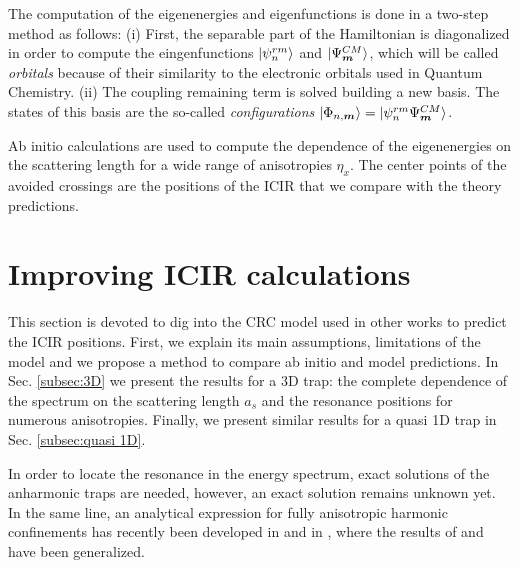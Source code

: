 \documentclass[aps,pre,twocolumn,superscriptaddress,showpacs]{revtex4-1}
\newcommand{\bfeq}[1]{{\boldsymbol{#1}}}
\begin{document}
The computation of the eigenenergies and eigenfunctions is done in a two-step method as follows: (i) First, the separable part of the Hamiltonian is diagonalized in order to compute the eingenfunctions $\ket{\psi^{rm}_n}$ and $\ket{\Psi^{CM}_{\bfeq{m}}}$, which will be called \textit{orbitals} because of their similarity to the electronic orbitals used in Quantum Chemistry. (ii) The coupling remaining term is solved building a new basis. The states of this basis are the so-called \textit{configurations} $\ket{\Phi_{n, \bfeq{m}}} = \ket{\psi^{rm}_n \Psi^{CM}_{\bfeq{m}}}$.  
		
Ab initio calculations are used to compute the dependence of the eigenenergies on the scattering length for a wide range of anisotropies $\eta_x$. The center points of the avoided crossings 
are the positions of the ICIR that we compare with the theory predictions.
\section{Improving ICIR calculations}  \label{sec:theory}
This section is devoted to dig into the CRC model used in other works to predict the ICIR positions. First, we explain its main assumptions, limitations of the model and we propose a method to compare ab initio and model predictions. In Sec. \ref{subsec:3D} we present the results for a 3D trap: the complete dependence of the spectrum on the scattering length $a_s$ and the resonance positions for numerous anisotropies. Finally, we present similar results for a quasi 1D trap in Sec. \ref{subsec:quasi 1D}.
	
In order to locate the resonance in the energy spectrum, exact solutions of the anharmonic traps are needed, however, an exact solution remains unknown yet. In the same line, an analytical expression for fully anisotropic harmonic confinements has recently been developed in \cite{PhysRevA.101.053624} and in \cite{PhysRevA.102.013314}, where the results of \cite{PhysRevA.74.022712} and \cite{Liang_2008} have been generalized. 
	
\end{document}
